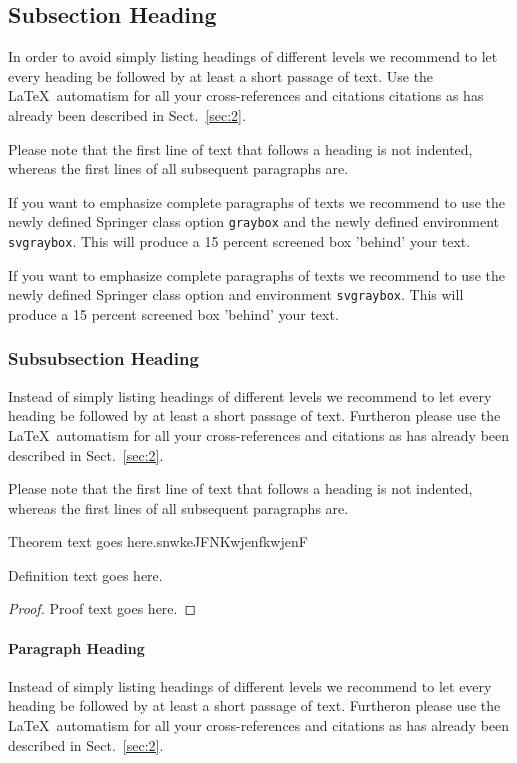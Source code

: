 \subsection{Subsection Heading} %
In order to avoid simply listing headings of different levels we recommend to let every heading be followed by at least a short passage of text. Use the \LaTeX\ automatism for all your cross-references and citations citations as has already been described in Sect.~\ref{sec:2}.

Please note that the first line of text that follows a heading is not indented, whereas the first lines of all subsequent paragraphs are.

\begin{svgraybox}
If you want to emphasize complete paragraphs of texts we recommend to use the newly defined Springer class option \verb|graybox| and the newly defined environment \verb|svgraybox|. This will produce a 15 percent screened box 'behind' your text.

If you want to emphasize complete paragraphs of texts we recommend to use the newly defined Springer class option and environment \verb|svgraybox|. This will produce a 15 percent screened box 'behind' your text.
\end{svgraybox}


\subsubsection{Subsubsection Heading}
Instead of simply listing headings of different levels we recommend to let every heading be followed by at least a short passage of text. Furtheron please use the \LaTeX\ automatism for all your cross-references and citations as has already been described in Sect.~\ref{sec:2}.

Please note that the first line of text that follows a heading is not indented, whereas the first lines of all subsequent paragraphs are.

\begin{theorem}
Theorem text goes here.snwkeJFNKwjenfkwjenF
\end{theorem}
%
%
\begin{definition}
Definition text goes here.
\end{definition}

\begin{proof}
Proof text goes here.
\end{proof}

\paragraph{Paragraph Heading} %
Instead of simply listing headings of different levels we recommend to let every heading be followed by at least a short passage of text. Furtheron please use the \LaTeX\ automatism for all your cross-references and citations as has already been described in Sect.~\ref{sec:2}.

